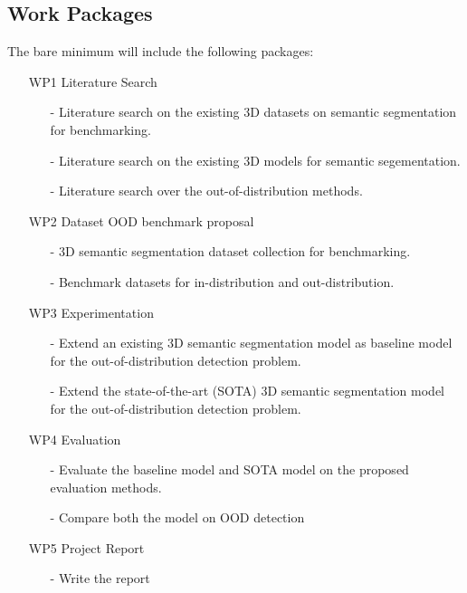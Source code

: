 \documentclass[thesis]{mas_proposal}
\begin{document}
\subsection{Work Packages}
The bare minimum will include the following packages:
\begin{enumerate}
    \item[WP1] Literature Search
    \begin{itemize}
        \item[-] Literature search on the existing 3D datasets on semantic segmentation for benchmarking.
        \item[-] Literature search on the existing  3D models for semantic segementation.
        \item[-] Literature search over the out-of-distribution methods.
    \end{itemize} 
    \item[WP2] Dataset OOD benchmark proposal
    \begin{itemize}
        \item[-] 3D semantic segmentation dataset collection for benchmarking.
        \item[-] Benchmark datasets for in-distribution and out-distribution.
    \end{itemize}
    \item[WP3] Experimentation
    \begin{itemize}
        \item[-] Extend an existing 3D semantic segmentation model as baseline model for the out-of-distribution detection problem.
        \item[-] Extend the state-of-the-art (SOTA) 3D semantic segmentation model for the out-of-distribution detection problem.
    \end{itemize}
    \item[WP4] Evaluation
    \begin{itemize}
        \item[-] Evaluate the baseline model and SOTA model on the proposed evaluation methods.
        \item[-] Compare both the model on OOD detection
    \end{itemize} 
    \item[WP5] Project Report
    \begin{itemize}
        \item[-] Write the report
    \end{itemize} 
\end{enumerate}
\end{document}
